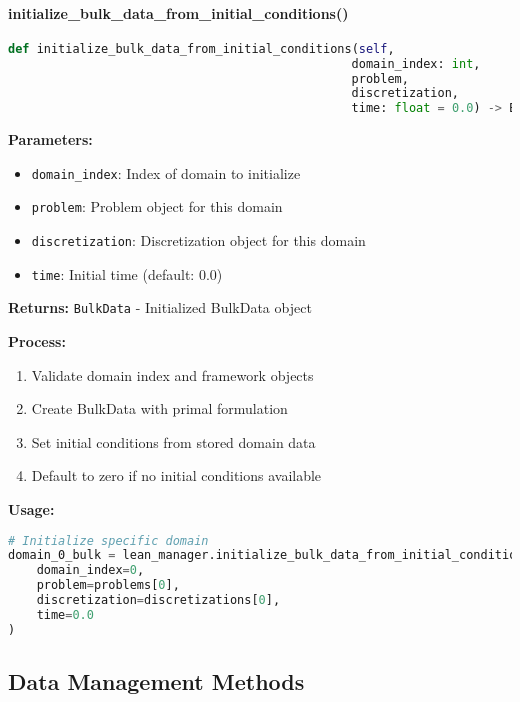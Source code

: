 \paragraph{initialize\_bulk\_data\_from\_initial\_conditions()}\leavevmode
\begin{lstlisting}[language=Python, caption=Initialize Single Domain Method]
def initialize_bulk_data_from_initial_conditions(self, 
                                                domain_index: int,
                                                problem,
                                                discretization,
                                                time: float = 0.0) -> BulkData
\end{lstlisting}

\textbf{Parameters:}
\begin{itemize}
    \item \texttt{domain\_index}: Index of domain to initialize
    \item \texttt{problem}: Problem object for this domain
    \item \texttt{discretization}: Discretization object for this domain
    \item \texttt{time}: Initial time (default: 0.0)
\end{itemize}

\textbf{Returns:} \texttt{BulkData} - Initialized BulkData object

\textbf{Process:}
\begin{enumerate}
    \item Validate domain index and framework objects
    \item Create BulkData with primal formulation
    \item Set initial conditions from stored domain data
    \item Default to zero if no initial conditions available
\end{enumerate}

\textbf{Usage:}
\begin{lstlisting}[language=Python, caption=Initialize Single Domain Usage]
# Initialize specific domain
domain_0_bulk = lean_manager.initialize_bulk_data_from_initial_conditions(
    domain_index=0,
    problem=problems[0],
    discretization=discretizations[0],
    time=0.0
)
\end{lstlisting}

\subsection{Data Management Methods}
\label{subsec:data_management}


